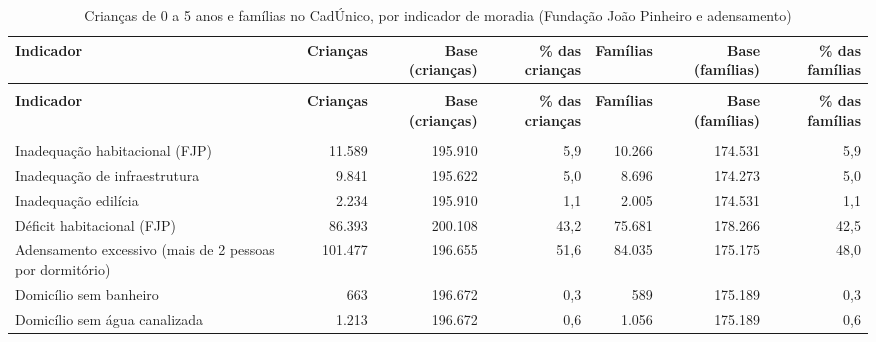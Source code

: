\begin{landscape}
{\scriptsize\setlength{\tabcolsep}{3pt}
\begin{longtable}{@{}>{\raggedright\arraybackslash}p{3.6cm}rrrrrr@{}}
\caption{Crianças de 0 a 5 anos e famílias no CadÚnico, por indicador de moradia (Fundação João Pinheiro e adensamento)}\label{tab:cadunico-moradia-resumo-0-a-5-2026}\\
\toprule \textbf{Indicador} & \textbf{Crianças} & \parbox[b]{2.20cm}{\raggedleft{} \textbf{Base (crianças)}} & \parbox[b]{2.20cm}{\raggedleft{} \textbf{\% das crianças}} & \textbf{Famílias} & \parbox[b]{2.20cm}{\raggedleft{} \textbf{Base (famílias)}} & \parbox[b]{2.20cm}{\raggedleft{} \textbf{\% das famílias}} \\ \midrule \endfirsthead
{}\\ \toprule \textbf{Indicador} & \textbf{Crianças} & \parbox[b]{2.20cm}{\raggedleft{} \textbf{Base (crianças)}} & \parbox[b]{2.20cm}{\raggedleft{} \textbf{\% das crianças}} & \textbf{Famílias} & \parbox[b]{2.20cm}{\raggedleft{} \textbf{Base (famílias)}} & \parbox[b]{2.20cm}{\raggedleft{} \textbf{\% das famílias}} \\ \midrule \endhead
\midrule {}\\ \endfoot
\bottomrule \endlastfoot
Inadequação habitacional (FJP) & 11.589 & 195.910 & 5,9 & 10.266 & 174.531 & 5,9 \\
Inadequação de infraestrutura & 9.841 & 195.622 & 5,0 & 8.696 & 174.273 & 5,0 \\
Inadequação edilícia & 2.234 & 195.910 & 1,1 & 2.005 & 174.531 & 1,1 \\
Déficit habitacional (FJP) & 86.393 & 200.108 & 43,2 & 75.681 & 178.266 & 42,5 \\
Adensamento excessivo (mais de 2 pessoas por dormitório) & 101.477 & 196.655 & 51,6 & 84.035 & 175.175 & 48,0 \\
Domicílio sem banheiro & 663 & 196.672 & 0,3 & 589 & 175.189 & 0,3 \\
Domicílio sem água canalizada & 1.213 & 196.672 & 0,6 & 1.056 & 175.189 & 0,6 \\
\end{longtable}}
\vspace{-6pt}
\end{landscape}


